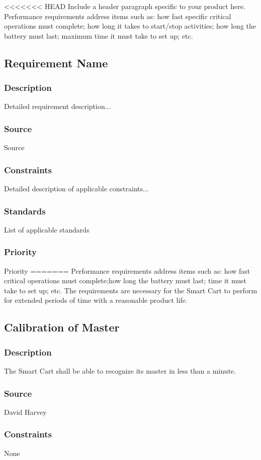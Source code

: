 <<<<<<< HEAD
Include a header paragraph specific to your product here. Performance requirements address items such as: how fast specific critical operations must complete; how long it takes to start/stop activities; how long the battery must last; maximum time it must take to set up; etc.

\subsection{Requirement Name}
\subsubsection{Description}
Detailed requirement description...
\subsubsection{Source}
Source
\subsubsection{Constraints}
Detailed description of applicable constraints...
\subsubsection{Standards}
List of applicable standards
\subsubsection{Priority}
Priority
=======
Performance requirements address items such as: how fast critical operations must complete;how long the battery must last; time it must take to set up; etc. The requirements are necessary for the Smart Cart to perform for extended periods of time with a reasonable product life. 

\subsection{Calibration of Master}
\subsubsection{Description}
The Smart Cart shall be able to recognize its master in less than a minute.
\subsubsection{Source}
David Harvey
\subsubsection{Constraints}
None
